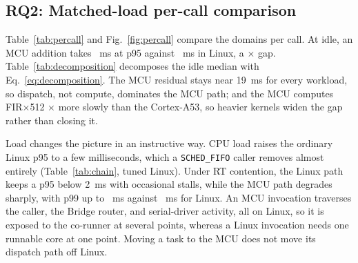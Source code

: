 \documentclass[conference]{IEEEtran}
\begin{document}
\subsection{RQ2: Matched-load per-call comparison}
\label{sec:percall}
Table~\ref{tab:percall} and Fig.~\ref{fig:percall} compare the domains per
call. At idle, an MCU addition takes \StageTwelveIdleRtAddP~ms at p95 against
\StageTwelveIdleLinuxAddP~ms in Linux, a \StageTwelveIdleRatio$\times$ gap.
Table~\ref{tab:decomposition} decomposes the idle median with
Eq.~\eqref{eq:decomposition}. The MCU residual stays near 19~ms for every
workload, so dispatch, not compute, dominates the MCU path; and the MCU
computes FIR$\times$512 \StageTwelveFirComputeRatio$\times$ more slowly than
the Cortex-A53, so heavier kernels widen the gap rather than closing it.

\begin{table}[!tb]
\caption{Per-call p95 latency (ms) with ordinary callers. Brackets give 95\%
block-bootstrap confidence intervals.}
\label{tab:percall}
\centering
\scriptsize
\setlength{\tabcolsep}{4pt}

\end{table}


\begin{table}[!tb]
\caption{Idle per-call decomposition (Eq.~\ref{eq:decomposition}). Compute is
measured inside each executor; the residual is the difference of medians.}
\label{tab:decomposition}
\centering
\footnotesize
\setlength{\tabcolsep}{4pt}

\end{table}

Load changes the picture in an instructive way. CPU load raises the
ordinary Linux p95 to a few milliseconds, which a \texttt{SCHED\_FIFO} caller
removes almost entirely (Table~\ref{tab:chain}, tuned Linux). Under RT contention, the Linux path keeps a p95
below 2~ms with occasional stalls, while the MCU path degrades sharply, with
p99 up to \StageTwelveContentionRtPNinetyNine~ms against
\StageTwelveContentionLinuxPNinetyNine~ms for Linux. An MCU invocation
traverses the caller, the Bridge router, and serial-driver activity, all on
Linux, so it is exposed to the co-runner at several points, whereas a Linux
invocation needs one runnable core at one point. Moving a task to the MCU
does not move its dispatch path off Linux.
\end{document}
